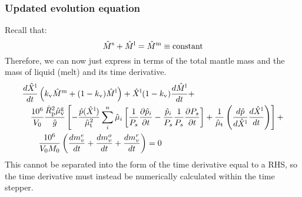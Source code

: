 \subsubsection{Updated evolution equation}
Recall that:
\begin{equation}
\hat{M}^{\rm s} + \hat{M}^{\rm l} = \hat{M}^{\rm m} \equiv \text{constant}
\label{eq:mantle_mass}
\end{equation}
Therefore, we can now just express in terms of the total mantle mass and the mass of liquid (melt) and its time derivative.  
\begin{align}
&\frac{d \hat{X}^{\rm l}}{d t} \left(k_{\rm v} \hat{M}^{\rm m} + (1-k_{\rm v}) \hat{M}^{\rm l} \right)
+ \hat{X}^{\rm l} (1-k_{\rm v}) \frac{d \hat{M}^{\rm l}}{d t} + \nonumber \\
&\quad \frac{10^6}{V_0} \frac{\hat{R}_{\rm p}^2 \hat{\mu}_{\rm v}^{\rm g}}{\hat{g}}
\left[
-\frac{\hat{p}(\hat{X}^{\rm l})}{\hat{\mu}_{\rm t}^2} \sum_i^n \hat{\mu}_i \left[ \frac{1}{P_s} \frac{\partial \hat{p}_i}{\partial t} - \frac{\hat{p}_i}{P_s} \frac{1}{P_s} \frac{\partial P_s}{\partial t} \right] + \frac{1}{\hat{\mu}_{\rm t}} \left( \frac{d \hat{p}}{d \hat{X}^{\rm l}} \frac{d \hat{X}^{\rm l}}{d t} \right)
\right]+ \nonumber \\
& \qquad \frac{10^6}{V_0 M_0} \left( \frac{dm_v^e}{dt} +  \frac{dm_v^o}{dt} + \frac{dm_v^r}{dt} \right) = 0
\end{align}
This cannot be separated into the form of the time derivative equal to a RHS, so the time derivative must instead be numerically calculated within the time stepper.
